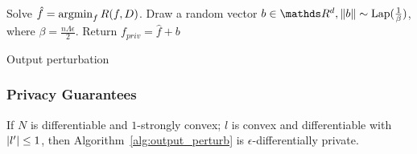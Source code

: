 \documentclass{article} %
\begin{document}
\begin{algorithm}[htb]
\begin{algorithmic}[1]
    \State Solve $\hat{f} = \operatorname*{argmin}_f R(f, D)$.
    \State Draw a random vector $b\in \R^d, \norm{b}\sim \text{Lap}(\frac{1}{\beta})$, where $\beta = \frac{n\Lambda \epsilon}{2}$.
    \State Return $f_{priv} = \hat{f} + b$
   \EndFunction
\end{algorithmic}
\caption{Output perturbation}\label{alg:output_perturb}
\end{algorithm}

\subsubsection{Privacy Guarantees}
\begin{theorem}
If $N$ is differentiable and $1$-strongly convex; $l$ is convex and differentiable with $\left\lvert l'\right\rvert \le 1$, then Algorithm~\ref{alg:output_perturb} is $\epsilon$-differentially private.
\end{theorem}
\end{document}
